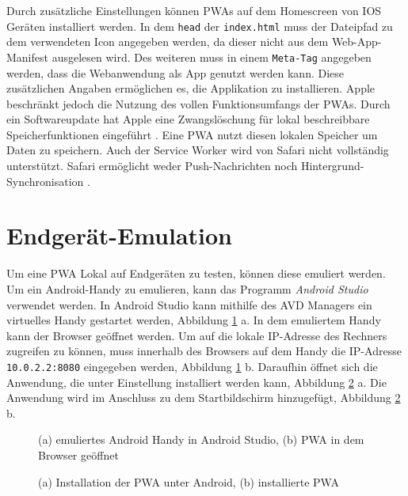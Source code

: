Durch zusätzliche Einstellungen können PWAs auf dem Homescreen von IOS Geräten installiert werden. In dem \texttt{head} der \texttt{index.html} muss der Dateipfad zu dem verwendeten Icon angegeben werden, da dieser nicht aus dem Web-App-Manifest ausgelesen wird. 
Des weiteren muss in einem \texttt{Meta-Tag} angegeben werden, dass die Webanwendung als App genutzt werden kann. Diese zusätzlichen Angaben ermöglichen es, die Applikation zu installieren. Apple beschränkt jedoch die Nutzung des vollen Funktionsumfangs der PWAs. Durch ein Softwareupdate hat Apple eine Zwangslöschung für lokal beschreibbare Speicherfunktionen eingeführt \cite{t3n2020}. Eine PWA nutzt diesen lokalen Speicher um Daten zu speichern. 
Auch der Service Worker wird von Safari nicht vollständig unterstützt. Safari ermöglicht weder Push-Nachrichten noch Hintergrund-Synchronisation \cite{mediaevent}. 



\section{Endgerät-Emulation}

Um eine PWA Lokal auf Endgeräten zu testen, können diese emuliert werden.           
Um ein Android-Handy zu emulieren, kann das Programm \textit{Android Studio} verwendet werden. In Android Studio kann mithilfe des \ac{AVD Managers} ein virtuelles Handy gestartet werden, Abbildung \ref{Android1} a. In dem emuliertem Handy kann der Browser geöffnet werden. Um auf die lokale IP-Adresse des Rechners zugreifen zu können, muss innerhalb des Browsers auf dem Handy die IP-Adresse \texttt{10.0.2.2:8080} eingegeben werden, Abbildung \ref{Android1} b. Daraufhin öffnet sich die Anwendung, die unter Einstellung installiert werden kann, Abbildung \ref{Android2} a. Die Anwendung wird im Anschluss zu dem Startbildschirm hinzugefügt, Abbildung \ref{Android2} b.  

\begin{figure}[!htb]
    \centering
    \qquad
    \caption{(a) emuliertes Android Handy in Android Studio, (b) PWA in dem Browser geöffnet}
    \label{Android1}
\end{figure}

\begin{figure}[!htb]
    \centering
    \qquad
    \caption{(a) Installation der PWA unter Android, (b) installierte PWA }
    \label{Android2}
\end{figure}
